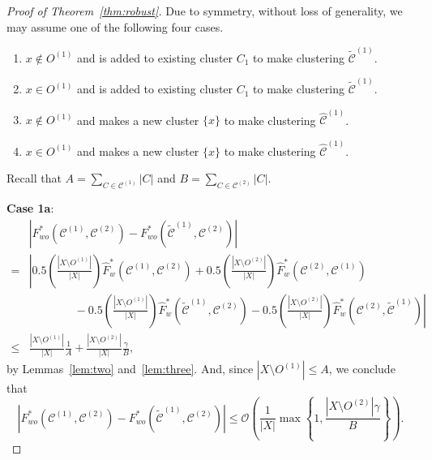 \documentclass[10pt,a4paper]{amsart}
\newcommand{\bigO}{\mathcal{O}}
\newcommand\cCone{\mathcal{C}^{(1)}}
\newcommand\cCtwo{\mathcal{C}^{(2)}}
\newcommand\hcCone{\hat{\mathcal{C}}^{(1)}}
\newcommand\tcCone{\tilde{\mathcal{C}}^{(1)}}
\begin{document}
\begin{proof}[Proof of Theorem~\ref{thm:robust}] 
    Due to symmetry, without loss of generality, we may assume one of the following four cases.
    \begin{enumerate}
        \item[1a.] $x \not \in O^{(1)}$ and is added to existing cluster $C_1$ to make clustering $\tcCone$.
        \item[1b.] $x \in O^{(1)}$ and is added to existing cluster $C_1$ to make clustering $\tcCone$.
        \item[2a.] $x \not \in O^{(1)}$ and makes a new cluster $\{x\}$ to make clustering $\hcCone$.
        \item[2b.] $x \in O^{(1)}$ and makes a new cluster $\{x\}$ to make clustering $\hcCone$.
    \end{enumerate}
    Recall that $A = \sum_{C \in \cCone} |C|$ and $B = \sum_{C \in \cCtwo} |C|$.

    \textbf{Case 1a}:
    \begin{align*}
        & \left| F^*_{wo}(\cCone, \cCtwo) - F^*_{wo}(\tcCone, \cCtwo) \right| \\
        = & \left| 0.5 \left( \frac{|X \setminus O^{(1)}|}{|X|} \right) \hat{F}^*_w(\cCone, \cCtwo) + 0.5 \left( \frac{| X \setminus O^{(2)}|}{|X|} \right) \hat{F}^*_w(\cCtwo, \cCone) \right. \\
        & \left. \qquad \qquad - 0.5 \left( \frac{|X \setminus O^{(1)}|}{|X|} \right) \hat{F}^*_w(\tcCone, \cCtwo) - 0.5 \left( \frac{|X \setminus O^{(2)}|}{|X|} \right) \hat{F}^*_w(\cCtwo, \tcCone) \right| \\
        \leq & \frac{|X \setminus O^{(1)}|}{|X|} \frac{1}{A} + \frac{|X \setminus O^{(2)}|}{|X|} \frac{ \gamma }{B},
    \end{align*}
    by Lemmas~\ref{lem:two} and~\ref{lem:three}.
    And, since $|X \setminus O^{(1)}| \leq A$, we conclude that
    \begin{equation*}
        \left| F^*_{wo}(\cCone, \cCtwo) - F^*_{wo}(\tcCone, \cCtwo) \right| \leq \bigO \left( \frac{1}{|X|} \max \left\{ 1, \frac{|X \setminus O^{(2)}| \gamma }{B} \right\} \right).
    \end{equation*}


\end{proof}
\end{document}
